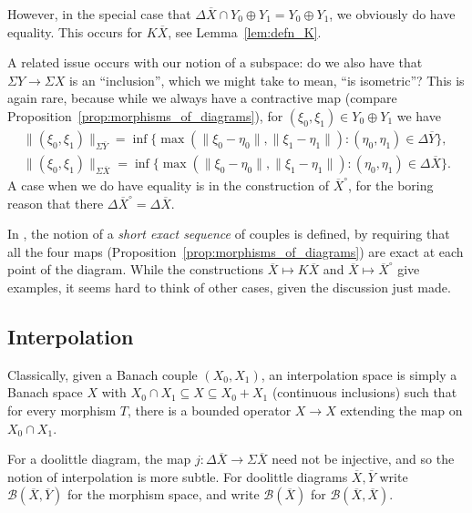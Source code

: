 \documentclass[a4paper,11pt]{article}
\theoremstyle{plain}
\theoremstyle{remark}
\newenvironment{remark}
  {\pushQED{\qed}\renewcommand{\qedsymbol}{$\triangle$}\remarkx}
  {\popQED\endremarkx}
\newcommand{\mc}[1]{\mathcal{#1}}
\begin{document}
\begin{remark}
However, in the special case that $\Delta\overline X \cap Y_0\oplus Y_1 = Y_0 \oplus Y_1$, we obviously do have equality.  This occurs for $K\overline X$, see Lemma~\ref{lem:defn_K}.
\end{remark}

A related issue occurs with our notion of a subspace: do we also have that $\Sigma Y \to \Sigma X$ is an ``inclusion'', which we might take to mean, ``is isometric''?  This is again rare, because while we always have a contractive map (compare Proposition~\ref{prop:morphisms_of_diagrams}), for $(\xi_0,\xi_1) \in Y_0\oplus Y_1$ we have
\begin{gather*}
\|(\xi_0,\xi_1)\|_{\Sigma\overline Y}
= \inf\big\{\max(\|\xi_0-\eta_0\|, \|\xi_1-\eta_1\|) : (\eta_0,\eta_1)\in \Delta\overline Y\big\}, \\
\|(\xi_0,\xi_1)\|_{\Sigma\overline X}
= \inf\big\{\max(\|\xi_0-\eta_0\|, \|\xi_1-\eta_1\|) : (\eta_0,\eta_1)\in \Delta\overline X\big\}.
\end{gather*}
A case when we do have equality is in the construction of $\overline X^\circ$, for the boring reason that there $\Delta\overline X^\circ = \Delta\overline X$.

In \cite[Section~I.2]{KP_InterpolationFunctorsDuality}, the notion of a \emph{short exact sequence} of couples is defined, by requiring that all the four maps (Proposition~\ref{prop:morphisms_of_diagrams}) are exact at each point of the diagram.  While the constructions $\overline X\mapsto K\overline X$ and $\overline X \mapsto \overline X^\circ$ give examples, it seems hard to think of other cases, given the discussion just made.


\subsection{Interpolation}

Classically, given a Banach couple $(X_0, X_1)$, an interpolation space is simply a Banach space $X$ with $X_0\cap X_1 \subseteq X \subseteq X_0+X_1$ (continuous inclusions) such that for every morphism $T$, there is a bounded operator $X\to X$ extending the map on $X_0\cap X_1$.

For a doolittle diagram, the map $j\colon \Delta\overline X \to \Sigma\overline X$ need not be injective, and so the notion of interpolation is more subtle.  For doolittle diagrams $\overline X, \overline Y$ write $\mc B(\overline X,\overline Y)$ for the morphism space, and write $\mc B(\overline X)$ for $\mc B(\overline X,\overline X)$.
\end{document}

